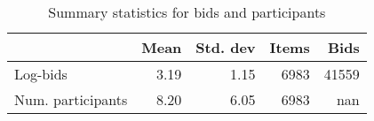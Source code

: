 \begin{table}
\centering
\caption{Summary statistics for bids and participants}
\label{tab:sumStats}
\begin{tabular}{lrrrr}
\toprule
{} & Mean & Std. dev &  Items &  Bids \\
\midrule
Log-bids          & 3.19 &     1.15 &   6983 & 41559 \\
Num. participants & 8.20 &     6.05 &   6983 &   nan \\
\bottomrule
\end{tabular}
\end{table}
